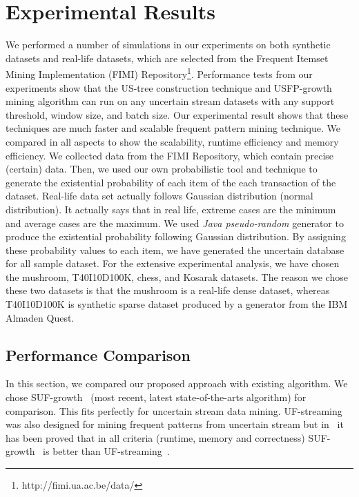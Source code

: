 \documentclass[10pt, conference, compsocconf]{IEEEtran}
\begin{document}
\section{Experimental Results}\label{Experiment}

We performed a number of simulations in our experiments on both synthetic datasets and real-life datasets, which are selected from the Frequent Itemset Mining Implementation (FIMI) Repository\footnote{http://fimi.ua.ac.be/data/}. Performance tests from our experiments show that the US-tree construction technique and \mbox{USFP-growth} mining algorithm can run on any uncertain stream datasets with any support threshold, window size, and batch size. Our experimental result shows that these techniques are much faster and scalable frequent pattern mining technique. We compared in all aspects to show the scalability, runtime efficiency and memory efficiency.
We collected data from the FIMI Repository, which contain precise (certain) data. Then, we used our own probabilistic tool and technique to generate the existential probability of each item of the each transaction of the dataset. Real-life data set actually follows Gaussian distribution (normal distribution). It actually says that in real life, extreme cases are the minimum and average cases are the maximum. We used \emph{Java pseudo-random} generator to produce the existential probability following Gaussian distribution. By assigning these probability values to each item, we have generated the uncertain database for all sample dataset. 
For the extensive experimental analysis, we have chosen the mushroom, T40I10D100K, chess, and Kosarak datasets. The reason we chose these two datasets is that the mushroom is a real-life dense dataset, whereas T40I10D100K is synthetic sparse dataset produced by a generator from the IBM Almaden Quest.

\subsection{Performance Comparison}

In this section, we compared our proposed approach with existing algorithm. We chose SUF-growth~\cite{DBLP:conf/icde/LeungH09} (most recent, latest state-of-the-arts algorithm) for comparison. This fits perfectly for uncertain stream data mining. \mbox{UF-streaming} was also designed for mining frequent patterns from uncertain stream but in~\cite{DBLP:conf/icde/LeungH09} it has been proved that in all criteria (runtime, memory and correctness) SUF-growth~\cite{DBLP:conf/icde/LeungH09} is better than UF-streaming~\cite{DBLP:conf/icde/LeungH09}. 
\end{document}
